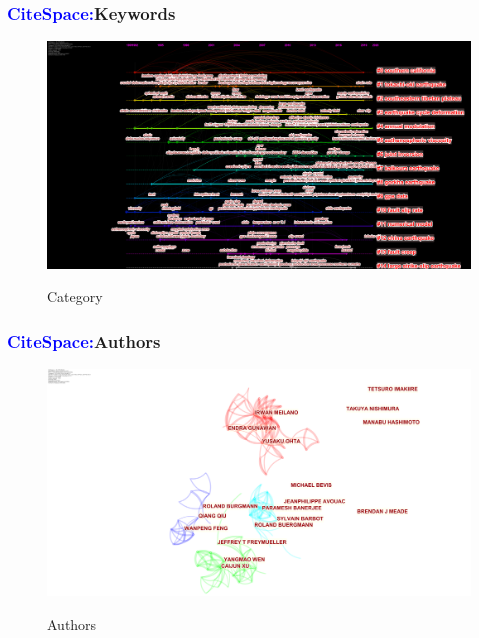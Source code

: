 ﻿\documentclass{beamer}
\begin{document}
\begin{frame}
\frametitle{\textcolor{blue}{CiteSpace:}Keywords}
\begin{figure}
  \centering
  \includegraphics[scale=0.1]{./pic/keywords.png}\\
  \caption{Category}\label{fig_okada}
\end{figure}
\end{frame}

\begin{frame}
\frametitle{\textcolor{blue}{CiteSpace:}Authors}
\begin{figure}
  \centering
  \includegraphics[scale=0.1]{./pic/author.png}\\
  \caption{Authors}\label{fig_okada}
\end{figure}
\end{frame}
\end{document}
